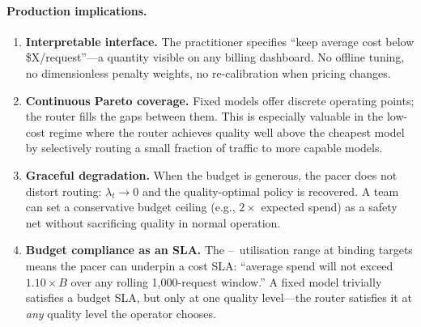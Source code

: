 \paragraph{Production implications.}
\begin{enumerate}[leftmargin=*,noitemsep]
  \item \textbf{Interpretable interface.}
    The practitioner specifies ``keep average cost below
    \$X/request''---a quantity visible on any billing dashboard.
    No offline tuning, no dimensionless penalty weights,
    no re-calibration when pricing changes.

  \item \textbf{Continuous Pareto coverage.}
    Fixed models offer discrete operating points;
    the router fills the gaps between them.
    This is especially valuable in the low-cost regime where
    the router achieves quality well above the cheapest model
    by selectively routing a small fraction of
    traffic to more capable models.

  \item \textbf{Graceful degradation.}
    When the budget is generous, the pacer does not distort routing:
    $\lambda_t \to 0$ and the quality-optimal policy is recovered.
    A team can set a conservative budget ceiling
    (e.g., $2\times$ expected spend) as a safety net without
    sacrificing quality in normal operation.

  \item \textbf{Budget compliance as an SLA.}
    The \bpUtilBindingLow--\bpUtilBindingHigh\ utilisation range
    at binding targets means the pacer can underpin a cost SLA:
    ``average spend will not exceed $1.10 \times B$ over any
    rolling 1{,}000-request window.''
    A fixed model trivially satisfies a budget SLA, but only at
    one quality level---the router satisfies it at \emph{any}
    quality level the operator chooses.
\end{enumerate}
